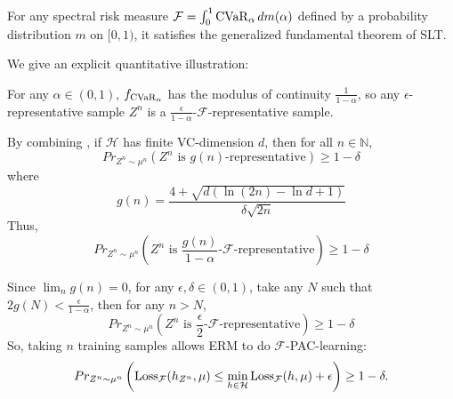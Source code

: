 \begin{cor}
For any spectral risk measure $\mathcal{F} = \int_0^1 \operatorname{CVaR}_\alpha dm(\alpha)$ defined by a probability distribution $m$ on $[0, 1)$, it satisfies the generalized fundamental theorem of SLT.
\end{cor}

We give an explicit quantitative illustration:
\begin{ex}
For any $\alpha\in(0, 1)$, $f_{\operatorname{CVaR}_\alpha}$ has the modulus of continuity $\frac{1}{1-\alpha}$, so any $\epsilon$-representative sample $Z^n$ is a $\frac{\epsilon}{1-\alpha}$-$\mathcal{F}$-representative sample. 

By combining \cite[Theorem 6.10, 6.11]{shalev-shwartzUnderstandingMachineLearning2014}, if $\mathcal{H}$ has finite VC-dimension $d$, then for all $n\in\mathbb{N}$, 
$$Pr_{Z^n \sim \mu^n}\left(Z^n \text{ is } 
g(n)
\text{-representative}\right) \ge 1-\delta$$
where
$$g(n) = \frac{{{4}+\sqrt{{{d}{\left( \ln{{\left({2}{n}\right)}}- \ln{{d}}+{1}\right)}}}}}{{\delta\sqrt{{{2}{n}}}}}$$ 
Thus, 
$$Pr_{Z^n \sim \mu^n}\left(Z^n \text{ is } 
\displaystyle\frac{ g{{\left({n}\right)}}}{{{1}-\alpha}} \text{-}\mathcal{F}\text{-representative}\right) \ge 1-\delta$$

Since $\lim_n g(n) = 0$, for any $\epsilon, \delta \in (0, 1)$, take any $N$ such that $2 g(N) < \frac{\epsilon}{{{1}-\alpha}}$, then for any $n > N$, 
$$Pr_{Z^n \sim \mu^n}\left(Z^n \text{ is } 
\frac \epsilon 2 \text{-}\mathcal{F}\text{-representative}\right) \ge 1-\delta$$
So, taking $n$ training samples allows ERM to do $\mathcal{F}$-PAC-learning:
$$Pr_{Z^n \sim \mu^n}\left(\operatorname{Loss}_\mathcal{F}(h_{Z^n}, \mu) \le \min_{h\in\mathcal{H}}\operatorname{Loss}_\mathcal{F}(h, \mu) + \epsilon\right) \ge 1-\delta.$$
\end{ex}
